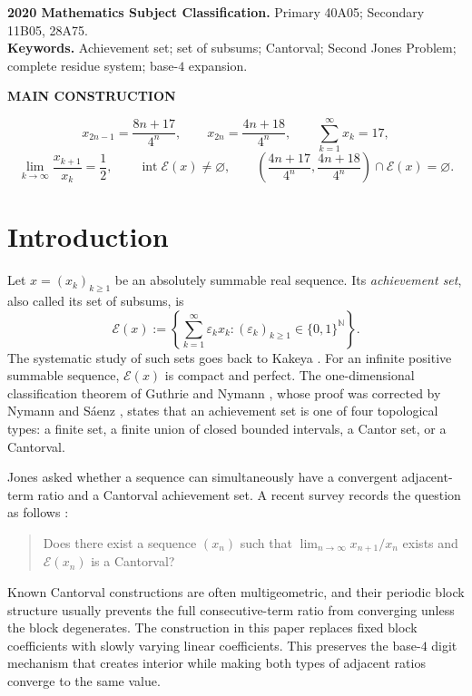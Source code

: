 \documentclass[11pt,letterpaper]{article}
\theoremstyle{metriqthm}
\theoremstyle{metriqdef}
\newcommand{\E}{\mathcal{E}}
\newcommand{\N}{\mathbb{N}}
\begin{document}
\noindent\textbf{2020 Mathematics Subject Classification.} Primary 40A05; Secondary 11B05, 28A75.\\
\textbf{Keywords.} Achievement set; set of subsums; Cantorval; Second Jones Problem; complete residue system; base-$4$ expansion.

\begin{resultbox}
\begin{minipage}{0.96\linewidth}
\centering
{\sffamily\bfseries\color{MetriqMint}MAIN CONSTRUCTION}\par\vspace{1.5mm}
\[
  x_{2n-1}=\frac{8n+17}{4^n},\qquad
  x_{2n}=\frac{4n+18}{4^n},\qquad
  \sum_{k=1}^{\infty}x_k=17,
\]
\[
  \lim_{k\to\infty}\frac{x_{k+1}}{x_k}=\frac12,
  \qquad
  \operatorname{int}\E(x)\ne\varnothing,
  \qquad
  \left(\frac{4n+17}{4^n},\frac{4n+18}{4^n}\right)\cap\E(x)=\varnothing.
\]
\end{minipage}
\end{resultbox}

\section{Introduction}

Let $x=(x_k)_{k\ge1}$ be an absolutely summable real sequence. Its \emph{achievement set}, also called its set of subsums, is
\begin{equation}\label{eq:achievement-set}
  \E(x)
  :=
  \left\{
    \sum_{k=1}^{\infty}\varepsilon_kx_k:
    (\varepsilon_k)_{k\ge1}\in\{0,1\}^{\N}
  \right\}.
\end{equation}
The systematic study of such sets goes back to Kakeya \cite{Kakeya1914}. For an infinite positive summable sequence, $\E(x)$ is compact and perfect. The one-dimensional classification theorem of Guthrie and Nymann \cite{GuthrieNymann1988}, whose proof was corrected by Nymann and S\'aenz \cite{NymannSaenz2000}, states that an achievement set is one of four topological types: a finite set, a finite union of closed bounded intervals, a Cantor set, or a Cantorval.

Jones \cite[p.~519]{Jones2011} asked whether a sequence can simultaneously have a convergent adjacent-term ratio and a Cantorval achievement set. A recent survey records the question as follows \cite[Problem~4]{GlabPrus2025}:
\begin{quote}
Does there exist a sequence $(x_n)$ such that $\lim_{n\to\infty}x_{n+1}/x_n$ exists and $\E(x_n)$ is a Cantorval?
\end{quote}
Known Cantorval constructions are often multigeometric, and their periodic block structure usually prevents the full consecutive-term ratio from converging unless the block degenerates. The construction in this paper replaces fixed block coefficients with slowly varying linear coefficients. This preserves the base-$4$ digit mechanism that creates interior while making both types of adjacent ratios converge to the same value.
\end{document}

